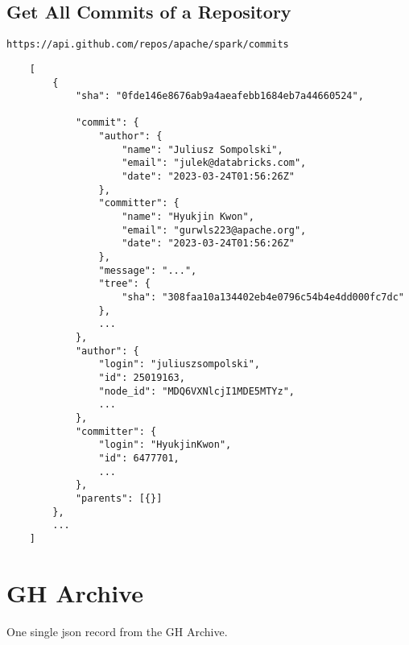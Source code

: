 \subsection{Get All Commits of a Repository}

\begin{verbatim}
https://api.github.com/repos/apache/spark/commits
\end{verbatim}


\begin{verbatim}
    [
        {
            "sha": "0fde146e8676ab9a4aeafebb1684eb7a44660524",

            "commit": {
                "author": {
                    "name": "Juliusz Sompolski",
                    "email": "julek@databricks.com",
                    "date": "2023-03-24T01:56:26Z"
                },
                "committer": {
                    "name": "Hyukjin Kwon",
                    "email": "gurwls223@apache.org",
                    "date": "2023-03-24T01:56:26Z"
                },
                "message": "...",
                "tree": {
                    "sha": "308faa10a134402eb4e0796c54b4e4dd000fc7dc"
                },
                ...
            },
            "author": {
                "login": "juliuszsompolski",
                "id": 25019163,
                "node_id": "MDQ6VXNlcjI1MDE5MTYz",
                ...
            },
            "committer": {
                "login": "HyukjinKwon",
                "id": 6477701,
                ...
            },
            "parents": [{}]
        },
        ...
    ]
\end{verbatim}




\section{GH Archive}
\label{a-gha}

One single json record from the GH Archive.

